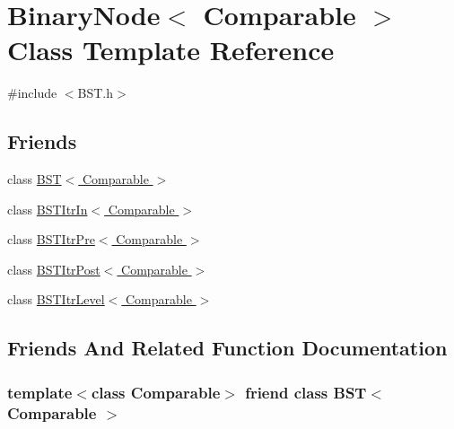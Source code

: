 \hypertarget{classBinaryNode}{}\section{Binary\+Node$<$ Comparable $>$ Class Template Reference}
\label{classBinaryNode}


{\ttfamily \#include $<$B\+S\+T.\+h$>$}

\subsection*{Friends}
\begin{DoxyCompactItemize}
\item 
class \hyperlink{classBinaryNode_a28a1adb9906f3ff7e12c2cb6fa2bd54e}{B\+S\+T$<$ Comparable $>$}
\item 
class \hyperlink{classBinaryNode_aab3993acac2ab24a0b59edb0c3acc775}{B\+S\+T\+Itr\+In$<$ Comparable $>$}
\item 
class \hyperlink{classBinaryNode_a45a55df6f11541416d4ea7684c575c1a}{B\+S\+T\+Itr\+Pre$<$ Comparable $>$}
\item 
class \hyperlink{classBinaryNode_a5dc153694be266f6e772659486219da7}{B\+S\+T\+Itr\+Post$<$ Comparable $>$}
\item 
class \hyperlink{classBinaryNode_a26ff00bc0d87069aed877f10fd3c80a8}{B\+S\+T\+Itr\+Level$<$ Comparable $>$}
\end{DoxyCompactItemize}


\subsection{Friends And Related Function Documentation}
\subsubsection[{\texorpdfstring{B\+S\+T$<$ Comparable $>$}{BST< Comparable >}}]{\setlength{\rightskip}{0pt plus 5cm}template$<$class Comparable$>$ friend class {\bf B\+ST}$<$ Comparable $>$\hspace{0.3cm}{\ttfamily [friend]}}\hypertarget{classBinaryNode_a28a1adb9906f3ff7e12c2cb6fa2bd54e}{}\label{classBinaryNode_a28a1adb9906f3ff7e12c2cb6fa2bd54e}

